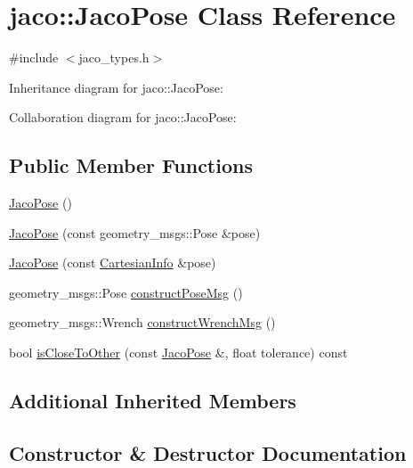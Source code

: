 \hypertarget{classjaco_1_1_jaco_pose}{}\section{jaco\+:\+:Jaco\+Pose Class Reference}
\label{classjaco_1_1_jaco_pose}


{\ttfamily \#include $<$jaco\+\_\+types.\+h$>$}



Inheritance diagram for jaco\+:\+:Jaco\+Pose\+:


Collaboration diagram for jaco\+:\+:Jaco\+Pose\+:
\subsection*{Public Member Functions}
\begin{DoxyCompactItemize}
\item 
\hyperlink{classjaco_1_1_jaco_pose_afadf92820c16343650a71572acf9c402}{Jaco\+Pose} ()
\item 
\hyperlink{classjaco_1_1_jaco_pose_a40acc797871a6bf6870ed0dd66ec75d7}{Jaco\+Pose} (const geometry\+\_\+msgs\+::\+Pose \&pose)
\item 
\hyperlink{classjaco_1_1_jaco_pose_a237eff1d503ce1020aad353febd51609}{Jaco\+Pose} (const \hyperlink{struct_cartesian_info}{Cartesian\+Info} \&pose)
\item 
geometry\+\_\+msgs\+::\+Pose \hyperlink{classjaco_1_1_jaco_pose_a9f2e68a94240e365afefd84d92f5a132}{construct\+Pose\+Msg} ()
\item 
geometry\+\_\+msgs\+::\+Wrench \hyperlink{classjaco_1_1_jaco_pose_a0ce9524097d0c974210ab20e63049b1c}{construct\+Wrench\+Msg} ()
\item 
bool \hyperlink{classjaco_1_1_jaco_pose_aed0e2dcb5cc3bc8315a2988bba51d513}{is\+Close\+To\+Other} (const \hyperlink{classjaco_1_1_jaco_pose}{Jaco\+Pose} \&, float tolerance) const 
\end{DoxyCompactItemize}
\subsection*{Additional Inherited Members}


\subsection{Constructor \& Destructor Documentation}
